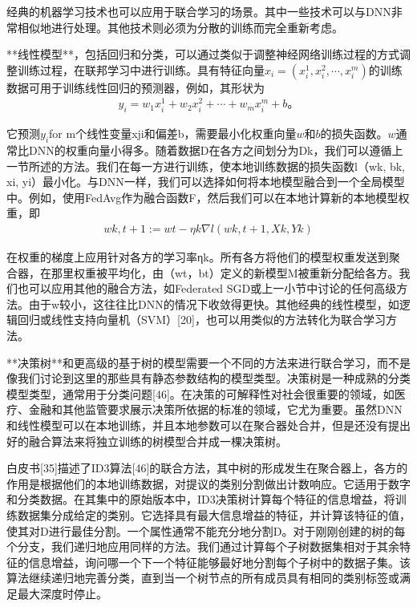 经典的机器学习技术也可以应用于联合学习的场景。其中一些技术可以与DNN非常相似地进行处理。其他技术则必须为分散的训练而完全重新考虑。

**线性模型**，包括回归和分类，可以通过类似于调整神经网络训练过程的方式调整训练过程，在联邦学习中进行训练。具有特征向量$x_{i}=(x^{1}_{i}, x^{2}_{i}, \cdots, x^{m}_{i})$的训练数据可用于训练线性回归的预测器，例如，其形状为
\begin{align}
	y_{i} = w_{1}x^{1}_{i} + w_{2}x^{2}_{i} + \cdots + w_{m}x^{m}_{i} + b。
\end{align}

它预测$y_{i}$for m个线性变量xji和偏差b，需要最小化权重向量$w$和$b$的损失函数。$w$通常比DNN的权重向量小得多。随着数据D在各方之间划分为Dk，我们可以遵循上一节所述的方法。我们在每一方进行训练，使本地训练数据的损失函数l（wk, bk, xi, yi）最小化。与DNN一样，我们可以选择如何将本地模型融合到一个全局模型中。例如，使用FedAvg作为融合函数F，然后我们可以在本地计算新的本地模型权重，即
\begin{align}
	wk,t+1:= wt− ηk\nabla l(wk,t+1, Xk, Yk)
\end{align}

在权重的梯度上应用针对各方的学习率ηk。所有各方将他们的模型权重发送到聚合器，在那里权重被平均化，由（wt，bt）定义的新模型M被重新分配给各方。我们也可以应用其他的融合方法，如Federated SGD或上一小节中讨论的任何高级方法。由于w较小，这往往比DNN的情况下收敛得更快。其他经典的线性模型，如逻辑回归或线性支持向量机（SVM）[20]，也可以用类似的方法转化为联合学习方法。

**决策树**和更高级的基于树的模型需要一个不同的方法来进行联合学习，而不是像我们讨论到这里的那些具有静态参数结构的模型类型。决策树是一种成熟的分类模型类型，通常用于分类问题[46]。在决策的可解释性对社会很重要的领域，如医疗、金融和其他监管要求展示决策所依据的标准的领域，它尤为重要。虽然DNN和线性模型可以在本地训练，并且本地参数可以在聚合器处合并，但是还没有提出好的融合算法来将独立训练的树模型合并成一棵决策树。

白皮书[35]描述了ID3算法[46]的联合方法，其中树的形成发生在聚合器上，各方的作用是根据他们的本地训练数据，对提议的类别分割做出计数响应。它适用于数字和分类数据。在其集中的原始版本中，ID3决策树计算每个特征的信息增益，将训练数据集分成给定的类别。它选择具有最大信息增益的特征，并计算该特征的值，使其对D进行最佳分割。一个属性通常不能充分地分割D。对于刚刚创建的树的每个分支，我们递归地应用同样的方法。我们通过计算每个子树数据集相对于其余特征的信息增益，询问哪一个下一个特征能够最好地分割每个子树中的数据子集。该算法继续递归地完善分类，直到当一个树节点的所有成员具有相同的类别标签或满足最大深度时停止。

